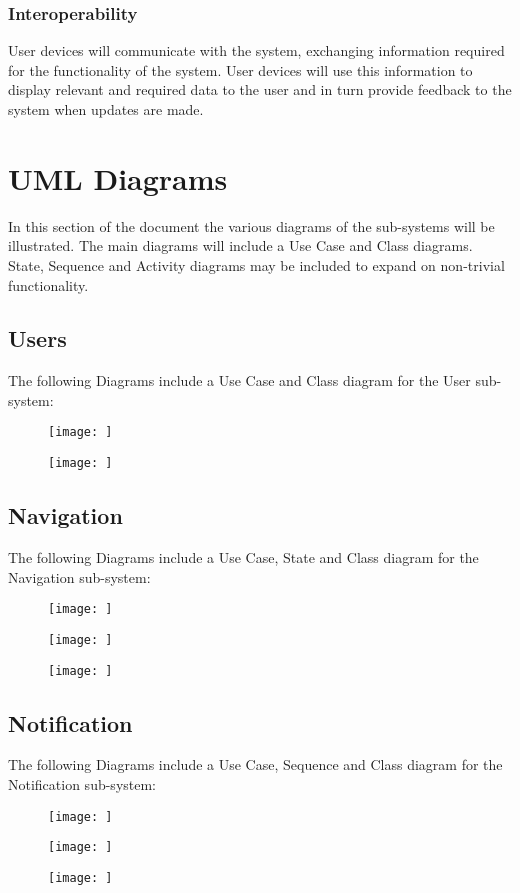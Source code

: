 \documentclass{article}
\begin{document}
		\subsubsection{Interoperability}
		User devices will communicate with the system, exchanging information required for the functionality of the system. User devices will use this information to display relevant and required data to the user and in turn provide feedback to the system when updates are made.

\section{UML Diagrams}
In this section of the document the various diagrams of the sub-systems will be illustrated. The main diagrams will include a Use Case and Class diagrams. State, Sequence and Activity diagrams may be included to expand on non-trivial functionality.
	\subsection{Users}
	The following Diagrams include a Use Case and Class diagram for the User sub-system:
	\begin{figure}[h]
  		\texttt{[image: ]}
	\end{figure}
	\begin{figure}[h]
  		\texttt{[image: ]}
	\end{figure}
	
	\subsection{Navigation}
	The following Diagrams include a Use Case, State and Class diagram for the Navigation sub-system:
	\begin{figure}[h]
  		\texttt{[image: ]}
	\end{figure}
	\begin{figure}[h]
  		\texttt{[image: ]}
	\end{figure}
	\begin{figure}[h]
  		\texttt{[image: ]}
	\end{figure}
	
	\subsection{Notification}
	The following Diagrams include a Use Case, Sequence and Class diagram for the Notification sub-system:
	\begin{figure}[h]
  		\texttt{[image: ]}
	\end{figure}
	\begin{figure}[h]
  		\texttt{[image: ]}
	\end{figure}
	\begin{figure}[h]
  		\texttt{[image: ]}
	\end{figure}
	
\end{document}
